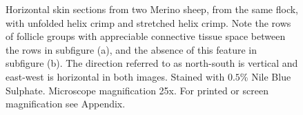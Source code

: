 \begin{figure}
\begin{turn}{90}
\begin{minipage}[c][\textwidth][c]{\textheight}
\caption{Horizontal skin sections from two Merino sheep, from the same flock, with unfolded helix crimp and stretched helix crimp. Note the  rows of follicle groups with appreciable connective tissue space between the rows in subfigure (a), and the absence of this feature in subfigure (b). The direction referred to as north-south is vertical and east-west is horizontal in both images. Stained with $0.5$\% Nile Blue Sulphate. Microscope magnification 25x. For printed or screen magnification see Appendix. }
\label{skin:hs}
\end{minipage}
\end{turn}
\end{figure}
%
